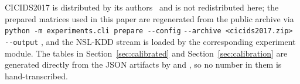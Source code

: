 \documentclass[10pt,conference]{IEEEtran}
\begin{document}
CICIDS2017 is distributed by its authors~\cite{sharafaldin2018cicids} and is not
redistributed here; the prepared matrices used in this paper are regenerated
from the public archive via
\texttt{python -m experiments.cli prepare -{}-config}
\texttt{-{}-archive <cicids2017.zip> -{}-output}
,
and the NSL-KDD stream is loaded by the corresponding experiment module. The
tables in Section~\ref{sec:calibrated} and Section~\ref{sec:calibration} are
generated directly from the JSON artifacts by
 and
, so no number in them is
hand-transcribed.



\end{document}
